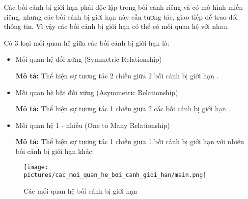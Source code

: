 

Các bối cảnh bị giới hạn phải độc lập trong bối cảnh riêng và có mô hình miền riêng, nhưng các bối cảnh bị giới hạn này cần tương tác, giao tiếp để trao đổi thông tin. Vì vậy các bối cảnh bị giới hạn có thể có mối quan hệ với nhau.

Có 3 loại mối quan hệ giữa các bối cảnh bị giới hạn là:

\begin{itemize}

\item Mối quan hệ đối xứng (Symmetric Relationship)

\textbf{Mô tả:} Thể hiện sự tương tác 2 chiều giữa 2 bối cảnh bị giới hạn .

\item Mối quan hệ bất đối xứng (Asymmetric Relationship)

\textbf{Mô tả:} Thể hiện sự tương tác 1 chiều giữa 2 các bối cảnh bị giới hạn .

\item Mối quan hệ 1 - nhiều (One to Many Relationship)

\textbf{Mô tả:} Thể hiện sự tương tác 1 chiều giữa 1 bối cảnh bị giới hạn với nhiều bối cảnh bị giới hạn khác.

\end{itemize}

\begin{figure}[H]

\centering

\texttt{[image: pictures/cac\_moi\_quan\_he\_boi\_canh\_gioi\_han/main.png]}

\caption{Các mối quan hệ bối cảnh bị giới hạn}

\end{figure}

